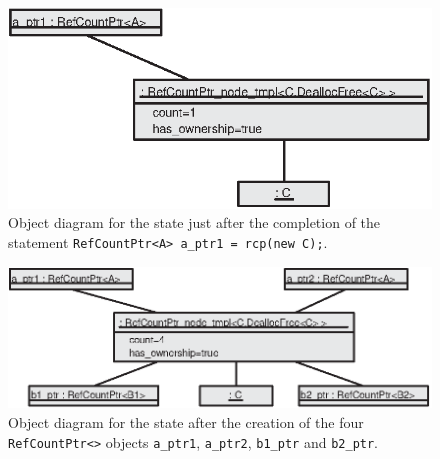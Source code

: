 {\bsinglespace
\begin{figure}
\begin{center}
\includegraphics*[bb= 0.0in 0.0in 4.4in 1.8in,scale=1.0
]{RefCountPtrObjectDiagram1}
\end{center}
{}\caption{ {}\label{rcp:fig:rcp-object-diagram_1} Object diagram for
the state just after the completion of the statement
{}\texttt{RefCountPtr<A> a\_ptr1 = rcp(new C);}.  }
\end{figure}
\esinglespace}

{\bsinglespace
\begin{figure}
\begin{center}
\includegraphics*[bb= 0.0in 0.0in 4.8in 1.8in,scale=1.0
]{RefCountPtrObjectDiagram4}
\end{center}
{}\caption{ {}\label{rcp:fig:rcp-object-diagram_4} Object diagram for
the state after the creation of the four {}\texttt{Ref\-Count\-Ptr<>}
objects {}\texttt{a\_ptr1}, {}\texttt{a\_ptr2}, {}\texttt{b1\_ptr} and
{}\texttt{b2\_ptr}.  }
\end{figure}
\esinglespace}

